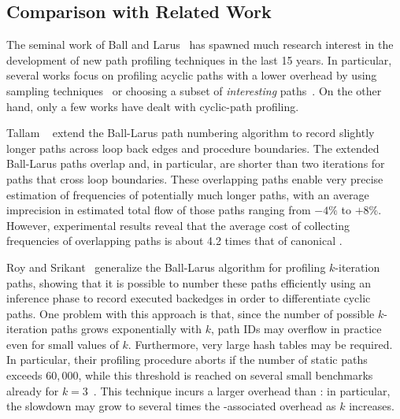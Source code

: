\subsection{Comparison with Related Work}

The seminal work of Ball and Larus~\cite{Ball96} has spawned much research interest in the development of new path profiling techniques in the last 15 years. In particular, several works focus on profiling acyclic paths with a lower overhead by using sampling techniques~\cite{Bond05,Bond05b} or choosing a subset of {\em interesting} paths~\cite{Apiwattanapong02,Joshi04,Vaswani07}.
On the other hand, only a few works have dealt with cyclic-path profiling.

Tallam \etal~\cite{Tallam04} extend the Ball-Larus path numbering algorithm to record slightly longer paths across loop back edges and procedure boundaries. The extended Ball-Larus paths overlap and, in particular, are shorter than two iterations for paths that cross loop boundaries. These overlapping paths enable very precise estimation of frequencies of potentially much longer paths, with an average imprecision in estimated total flow of those paths ranging from $-4\%$ to $+8\%$. However, experimental results reveal that the average cost of collecting frequencies of overlapping paths is about 4.2 times that of canonical \blpp.

Roy and Srikant~\cite{Roy09} generalize the Ball-Larus algorithm for profiling $k$-iteration paths, showing that it is possible to number these paths efficiently using an inference phase to record executed backedges in order to differentiate cyclic paths. One problem with this approach is that, since the number of possible $k$-iteration paths grows exponentially with $k$, path IDs may overflow in practice even for small values of $k$. Furthermore, very large hash tables may be required. In particular, their profiling procedure aborts if the number of static paths exceeds $60,000$, while this threshold is reached on several small benchmarks already for $k=3$~\cite{Li12}. This technique incurs a larger overhead than \blpp: in particular, the slowdown may grow to several times the \blpp-associated overhead as $k$ increases.

